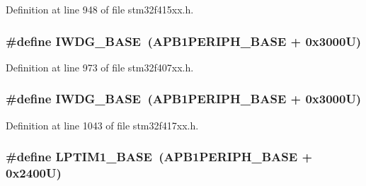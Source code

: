 Definition at line 948 of file stm32f415xx.\+h.

\subsubsection[{\texorpdfstring{I\+W\+D\+G\+\_\+\+B\+A\+SE}{IWDG_BASE}}]{\setlength{\rightskip}{0pt plus 5cm}\#define I\+W\+D\+G\+\_\+\+B\+A\+SE~({\bf A\+P\+B1\+P\+E\+R\+I\+P\+H\+\_\+\+B\+A\+SE} + 0x3000\+U)}\hypertarget{group___peripheral__registers__structures_ga8543ee4997296af5536b007cd4748f55}{}\label{group___peripheral__registers__structures_ga8543ee4997296af5536b007cd4748f55}


Definition at line 973 of file stm32f407xx.\+h.

\subsubsection[{\texorpdfstring{I\+W\+D\+G\+\_\+\+B\+A\+SE}{IWDG_BASE}}]{\setlength{\rightskip}{0pt plus 5cm}\#define I\+W\+D\+G\+\_\+\+B\+A\+SE~({\bf A\+P\+B1\+P\+E\+R\+I\+P\+H\+\_\+\+B\+A\+SE} + 0x3000\+U)}\hypertarget{group___peripheral__registers__structures_ga8543ee4997296af5536b007cd4748f55}{}\label{group___peripheral__registers__structures_ga8543ee4997296af5536b007cd4748f55}


Definition at line 1043 of file stm32f417xx.\+h.

\subsubsection[{\texorpdfstring{L\+P\+T\+I\+M1\+\_\+\+B\+A\+SE}{LPTIM1_BASE}}]{\setlength{\rightskip}{0pt plus 5cm}\#define L\+P\+T\+I\+M1\+\_\+\+B\+A\+SE~({\bf A\+P\+B1\+P\+E\+R\+I\+P\+H\+\_\+\+B\+A\+SE} + 0x2400\+U)}\hypertarget{group___peripheral__registers__structures_ga012ceb003fbb615eedb39a8d7f31c9c6}{}\label{group___peripheral__registers__structures_ga012ceb003fbb615eedb39a8d7f31c9c6}


